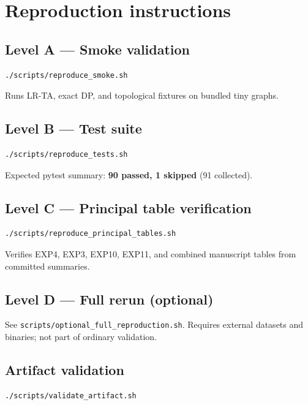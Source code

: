 \section{Reproduction instructions}
\label{sec:or1-reproduce}

\subsection{Level A --- Smoke validation}

\begin{verbatim}
./scripts/reproduce_smoke.sh
\end{verbatim}
Runs LR-TA, exact DP, and topological fixtures on bundled tiny graphs.

\subsection{Level B --- Test suite}

\begin{verbatim}
./scripts/reproduce_tests.sh
\end{verbatim}
Expected pytest summary: \textbf{90 passed, 1 skipped} (91 collected).

\subsection{Level C --- Principal table verification}

\begin{verbatim}
./scripts/reproduce_principal_tables.sh
\end{verbatim}
Verifies EXP4, EXP3, EXP10, EXP11, and combined manuscript tables from committed summaries.

\subsection{Level D --- Full rerun (optional)}

See \texttt{scripts/optional\_full\_reproduction.sh}. Requires external datasets and binaries; not part of ordinary validation.

\subsection{Artifact validation}

\begin{verbatim}
./scripts/validate_artifact.sh
\end{verbatim}
